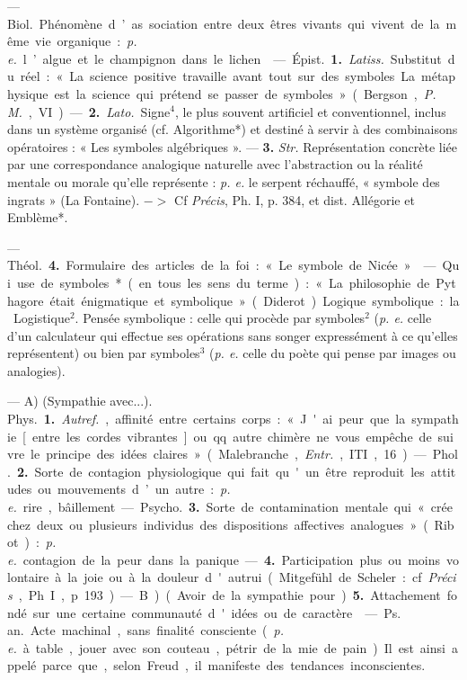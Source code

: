 \begin{itemize}[leftmargin=1cm, label=, itemsep=1pt]
 — \si{Biol.} Phénomène d’as
sociation entre deux êtres vivants
qui vivent de la même vie organique :
{\it p. e.} l’algue et le champignon dans
le lichen.

 — \si{Épist.} {\bf 1.} {\it Latiss.} Substitut
du réel : « La science positive travaille avant tout sur des symboles...
La métaphysique est la science qui
prétend se passer de symboles »
(Bergson, {\it P. M.}, VI). — {\bf 2.} {\it Lato.}
Signe$^4$, le plus souvent artificiel et
conventionnel, inclus dans un système organisé (cf. Algorithme*) et
destiné à servir à des combinaisons
opératoires : « Les symboles algébriques ». — {\bf 3.} {\it Str.} Représentation
concrète liée par une correspondance analogique naturelle avec
l’abstraction ou la réalité mentale
ou morale qu’elle représente : {\it p. e.} le
serpent réchauffé, « symbole des
ingrats » (La Fontaine). $->$ Cf
{\it Précis}, Ph. I, p. 384, et dist. Allégorie et Emblème*.

— \si{Théol.} {\bf 4.} Formulaire des articles de la foi : « Le symbole de
Nicée ».

 — Qui use de symboles*
(en tous les sens du terme) : « La
philosophie de Pythagore était énigmatique et symbolique » (Diderot).
Logique symbolique : la Logistique$^2$.
Pensée symbolique : celle qui procède
par symboles$^2$ ({\it p. e.} celle d’un calculateur
qui effectue ses opérations
sans songer expressément à ce
qu’elles représentent) ou bien par
symboles$^3$ ({\it p. e.} celle du poète qui
pense par images ou analogies).

 — A) (Sympathie avec...).
\si{Phys.} {\bf 1.} {\it Autref.}, affinité entre certains corps : « J'ai peur que la sympathie [entre les cordes vibrantes]
ou qq. autre chimère ne vous empêche de suivre le principe des idées
claires » (Malebranche, {\it Entr.}, ITI,
16). — \si{Phol.} {\bf 2.} Sorte de contagion
physiologique qui fait qu'un être
reproduit les attitudes ou mouvements d’un autre : {\it p. e.} rire, bâillement. — \si{Psycho.} {\bf 3.} Sorte de contamination mentale qui « crée chez
deux ou plusieurs individus des
dispositions affectives analogues »
(Ribot) : {\it p. e.} contagion de la peur
dans la panique. — {\bf 4.} Participation
plus ou moins volontaire à la joie ou
à la douleur d'autrui (Mitgefühl de
Scheler : cf. {\it Précis}, Ph. I, p. 193).

— B) (Avoir de la sympathie
pour...). {\bf 5.} Attachement fondé sur
une certaine communauté d'idées
ou de caractère.

 — \si{Ps. an.}
Acte machinal, sans finalité consciente ({\it p. e.} à table, jouer avec son
couteau, pétrir de la mie de pain).
Il est ainsi appelé parce que, selon
Freud, il manifeste des tendances
inconscientes.


\end{itemize}
